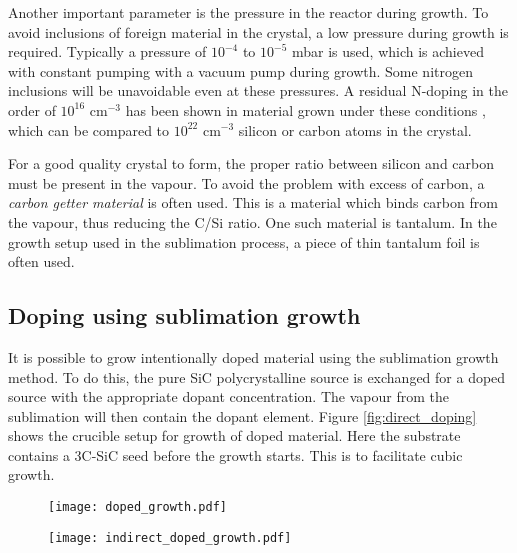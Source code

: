 Another important parameter is the pressure in the reactor during growth. To avoid inclusions of foreign material in the crystal, a low pressure during growth is required. Typically a pressure of $10^{-4}$ to $10^{-5}$ mbar is used, which is achieved with constant pumping with a vacuum pump during growth. Some nitrogen inclusions will be unavoidable even at these pressures. A residual N-doping in the order of $10^{16}$ cm$^{-3}$ has been shown in material grown under these conditions \cite{Jokubavicius2014}, which can be compared to $10^{22}$ cm$^{-3}$ silicon or carbon atoms in the crystal. 

For a good quality crystal to form, the proper ratio between silicon and carbon must be present in the vapour. To avoid the problem with excess of carbon, a \emph{carbon getter material} is often used. This is a material which binds carbon from the vapour, thus reducing the C/Si ratio. One such material is tantalum. In the growth setup used in the sublimation process, a piece of thin tantalum foil is often used.  

\subsection{Doping using sublimation growth}
\label{sec:growth:fsgp:doping}
It is possible to grow intentionally doped material using the sublimation growth method. To do this, the pure SiC polycrystalline source is exchanged for a doped source with the appropriate dopant concentration. The vapour from the sublimation will then contain the dopant element. Figure \ref{fig:direct_doping} shows the crucible setup for growth of doped material. Here the substrate contains a 3C-SiC seed before the growth starts. This is to facilitate cubic growth. 

\begin{figure}[h]
\centering
\begin{minipage}{.5\textwidth}
  \centering
  \texttt{[image: doped\_growth.pdf]}
  \label{fig:direct_doping}
\end{minipage}%
\begin{minipage}{.5\textwidth}
  \centering
  \texttt{[image: indirect\_doped\_growth.pdf]}
  \label{fig:indirect_doping}
\end{minipage}
\end{figure}

